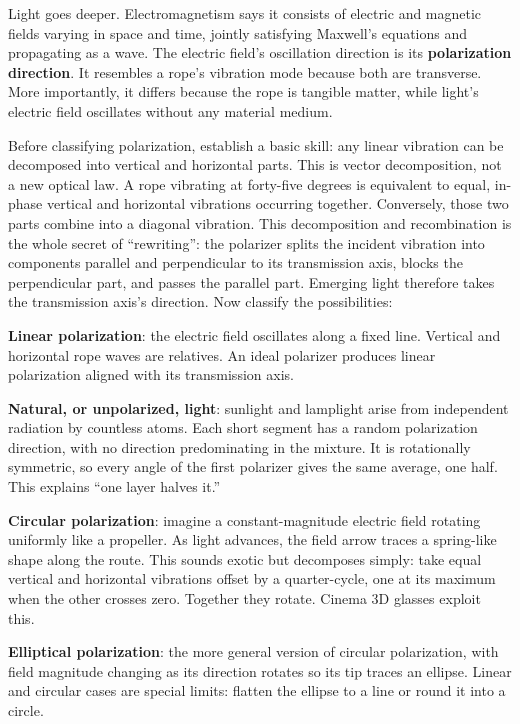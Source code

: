 Light goes deeper. Electromagnetism says it consists of electric and magnetic fields varying in space and time, jointly satisfying Maxwell's equations and propagating as a wave. The electric field's oscillation direction is its \textbf{polarization direction}. It resembles a rope's vibration mode because both are transverse. More importantly, it differs because the rope is tangible matter, while light's electric field oscillates without any material medium.

Before classifying polarization, establish a basic skill: any linear vibration can be decomposed into vertical and horizontal parts. This is vector decomposition, not a new optical law. A rope vibrating at forty-five degrees is equivalent to equal, in-phase vertical and horizontal vibrations occurring together. Conversely, those two parts combine into a diagonal vibration. This decomposition and recombination is the whole secret of ``rewriting'': the polarizer splits the incident vibration into components parallel and perpendicular to its transmission axis, blocks the perpendicular part, and passes the parallel part. Emerging light therefore takes the transmission axis's direction. Now classify the possibilities:

\textbf{Linear polarization}: the electric field oscillates along a fixed line. Vertical and horizontal rope waves are relatives. An ideal polarizer produces linear polarization aligned with its transmission axis.

\textbf{Natural, or unpolarized, light}: sunlight and lamplight arise from independent radiation by countless atoms. Each short segment has a random polarization direction, with no direction predominating in the mixture. It is rotationally symmetric, so every angle of the first polarizer gives the same average, one half. This explains ``one layer halves it.''

\textbf{Circular polarization}: imagine a constant-magnitude electric field rotating uniformly like a propeller. As light advances, the field arrow traces a spring-like shape along the route. This sounds exotic but decomposes simply: take equal vertical and horizontal vibrations offset by a quarter-cycle, one at its maximum when the other crosses zero. Together they rotate. Cinema 3D glasses exploit this.

\textbf{Elliptical polarization}: the more general version of circular polarization, with field magnitude changing as its direction rotates so its tip traces an ellipse. Linear and circular cases are special limits: flatten the ellipse to a line or round it into a circle.


